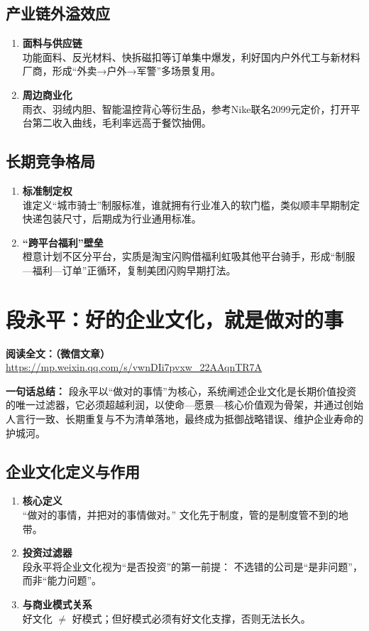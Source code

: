 \subsection{产业链外溢效应}
\begin{enumerate}[leftmargin=*, nosep]
    \item \textbf{面料与供应链}  \\
    功能面料、反光材料、快拆磁扣等订单集中爆发，利好国内户外代工与新材料厂商，形成“外卖→户外→军警”多场景复用。
    \item \textbf{周边商业化}  \\
    雨衣、羽绒内胆、智能温控背心等衍生品，参考Nike联名2099元定价，打开平台第二收入曲线，毛利率远高于餐饮抽佣。
\end{enumerate}

\subsection{长期竞争格局}
\begin{enumerate}[leftmargin=*, nosep]
    \item \textbf{标准制定权}  \\
    谁定义“城市骑士”制服标准，谁就拥有行业准入的软门槛，类似顺丰早期制定快递包装尺寸，后期成为行业通用标准。
    \item \textbf{“跨平台福利”壁垒}  \\
    橙意计划不区分平台，实质是淘宝闪购借福利虹吸其他平台骑手，形成“制服—福利—订单”正循环，复制美团闪购早期打法。
\end{enumerate}

\clearpage

\section{段永平：好的企业文化，就是做对的事}
\vspace{1cm}
\noindent\textbf{阅读全文：（微信文章）} \url{https://mp.weixin.qq.com/s/vwnDIi7pvxw_22AAqnTR7A}

\textbf{一句话总结：}  
段永平以“做对的事情”为核心，系统阐述企业文化是长期价值投资的唯一过滤器，它必须超越利润，以使命—愿景—核心价值观为骨架，并通过创始人言行一致、长期重复与不为清单落地，最终成为抵御战略错误、维护企业寿命的护城河。

\subsection{企业文化定义与作用}
\begin{enumerate}[leftmargin=*, nosep]
    \item \textbf{核心定义}  \\
    “做对的事情，并把对的事情做对。”  
    文化先于制度，管的是制度管不到的地带。
    \item \textbf{投资过滤器}  \\
    段永平将企业文化视为“是否投资”的第一前提：  
    不选错的公司是“是非问题”，而非“能力问题”。
    \item \textbf{与商业模式关系}  \\
    好文化 $\neq$ 好模式；但好模式必须有好文化支撑，否则无法长久。
\end{enumerate}

